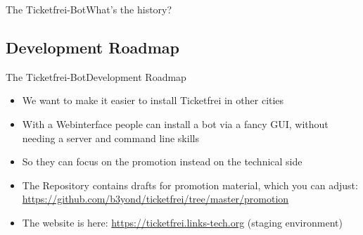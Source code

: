 \documentclass[10pt]{beamer}
\begin{document}
{\begin{frame}{The Ticketfrei-Bot}{What's the history?}
\end{frame}

\subsection{Development Roadmap}
\begin{frame}{The Ticketfrei-Bot}{Development Roadmap}

\begin{itemize}
  \item<1-> We want to make it easier to install Ticketfrei in other cities
  \item<1-> With a Webinterface people can install a bot via a fancy GUI, without needing a server and command line skills
  \item<2-> So they can focus on the promotion instead on the technical side
  \item<2-> The Repository contains drafts for promotion material, which you can adjust: \url{https://github.com/b3yond/ticketfrei/tree/master/promotion}
  \item<2-> The website is here: \url{https://ticketfrei.links-tech.org} (staging environment)
\end{itemize}


\end{frame}

}
\end{document}
